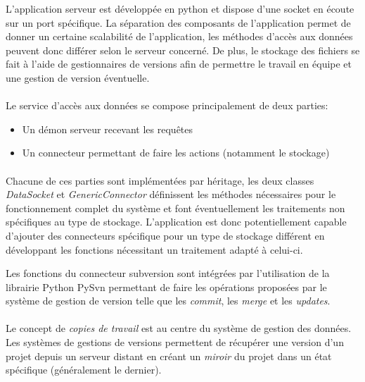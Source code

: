 \documentclass[a4paper,12pt]{article}
\begin{document}
L'application serveur est développée en python et dispose d'une socket en écoute sur un port spécifique.
La séparation des composants de l'application permet de donner un certaine scalabilité de l'application, les méthodes d'accès aux données peuvent donc différer selon le serveur concerné.
De plus, le stockage des fichiers se fait à l'aide de gestionnaires de versions afin de permettre le travail en équipe et une gestion de version éventuelle.

\paragraph{}
Le service d'accès aux données se compose principalement de deux parties:

\begin{itemize}
\item Un démon serveur recevant les requêtes
\item Un connecteur permettant de faire les actions (notamment le stockage)
\end{itemize}

\paragraph{}
Chacune de ces parties sont implémentées par héritage, les deux classes \emph{DataSocket} et \emph{GenericConnector} définissent les méthodes nécessaires pour le fonctionnement complet du système et font éventuellement les traitements non spécifiques au type de stockage.
L'application est donc potentiellement capable d'ajouter des connecteurs spécifique pour un type de stockage différent en développant les fonctions nécessitant un traitement adapté à celui-ci.

Les fonctions du connecteur subversion sont intégrées par l'utilisation de la librairie Python PySvn permettant de faire les opérations proposées par le système de gestion de version telle que les \emph{commit}, les \emph{merge} et les \emph{updates}.

\paragraph{}
Le concept de \emph{copies de travail} est au centre du système de gestion des données.
Les systèmes de gestions de versions permettent de récupérer une version d'un projet depuis un serveur distant en créant un \emph{miroir} du projet dans un état spécifique (généralement le dernier).
\end{document}
